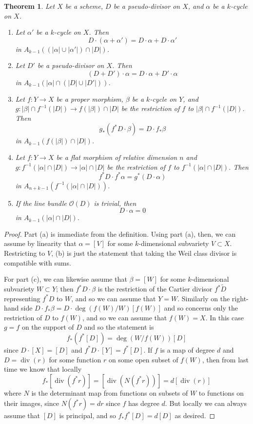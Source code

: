 \documentclass[leqno, openany]{memoir}
\newtheorem{thm}{Theorem}[section]
\theoremstyle{definition}
\theoremstyle{remark}
\theoremstyle{plain}
\theoremstyle{definition}
\theoremstyle{remark}
\newcommand{\mc}[1]{\mathcal{#1}}
\renewcommand{\div}{\operatorname{div}}
\begin{document}
\begin{thm} \label{properties} Let $X$ be a scheme, $D$ be a pseudo-divisor on
    $X$, and $\alpha$ be a $k$-cycle on $X$.  \begin{enumerate}[label=(\alph*)]
        \item Let $\alpha'$ be a $k$-cycle on $X$. Then \[ D \cdot (\alpha +
            \alpha') = D \cdot \alpha + D \cdot \alpha' \] in $A_{k-1}
            ((|\alpha| \cup |\alpha'|) \cap |D|)$.  \item Let $D'$ be a
            pseudo-divisor on $X$. Then \[ (D + D') \cdot \alpha = D \cdot
                \alpha + D' \cdot \alpha \] in $A_{k-1}(|\alpha| \cap (|D| \cup
                |D'|))$.  \item Let $f\colon Y \to X$ be a proper morphism,
                $\beta$ be a $k$-cycle on $Y$, and $g\colon |\beta| \cap
                f^{-1}(|D|) \to f(|\beta|) \cap |D|$ be the restriction of $f$
                to $|\beta| \cap f^{-1}(|D|)$. Then \[ g_* (f^* D \cdot \beta)
                = D \cdot f_* \beta \] in $A_{k-1}(f(|\beta|) \cap |D|)$.
            \item Let $f\colon Y \to X$ be a flat morphism of relative
                dimension $n$ and $g\colon f^{-1}(|\alpha| \cap |D|) \to
                |\alpha| \cap |D|$ be the restriction of $f$ to
                $f^{-1}(|\alpha| \cap |D|)$. Then \[ f^* D \cdot f^* \alpha =
                g^* (D \cdot \alpha) \] in $A_{n+k-1}(f^{-1}(|\alpha| \cap
                |D|))$.  \item If the line bundle $\mc{O}(D)$ is trivial, then
            \[ D \cdot \alpha = 0 \] in $A_{k-1}(|\alpha| \cap |D|)$.
        \end{enumerate} \end{thm} \begin{proof} Part (a) is immediate from the
        definition. Using part (a), then, we can assume by linearity that
        $\alpha = [V]$ for some $k$-dimensional subvariety $V \subset X$.
        Restricting to $V$, (b) is just the statement that taking the Weil
        class divisor is compatible with sums.

For part (c), we can likewise assume that $\beta = [W]$ for some
$k$-dimensional subvariety $W \subset Y$; then $f^* D \cdot \beta$ is the
restriction of the Cartier divisor $f^* \tilde D$ representing $f^* D$ to $W$,
and so we can assume that $Y = W$. Similarly on the right-hand side $D \cdot
f_* \beta = D \cdot \deg(f(W)/W) [f(W)]$ and so concerns only the restriction
of $D$ to $f(W)$, and so we can assume that $f(W) = X$. In this case $g = f$ on
the support of $D$ and so the statement is \[ f_* (f^* [D]) = \deg(W/f(W)) [D]
    \] since $D \cdot [X] = [D]$ and $f^* D \cdot [Y] = f^* [D]$. If $f$ is a
    map of degree $d$ and $D = \div(r)$ for some function $r$ on some open
    subset of $f(W)$, then from last time we know that locally \[ f_* [\div(f^*
    r)] = [\div(N(f^* r))] = d [\div(r)] \] where $N$ is the determinant map
    from functions on subsets of $W$ to functions on their images, since $N(f^*
    r) = dr$ since $f$ has degree $d$. But locally we can always assume that
    $[D]$ is principal, and so $f_* f^* [D] = d [D]$ as desired.


\end{proof}
\end{document}

